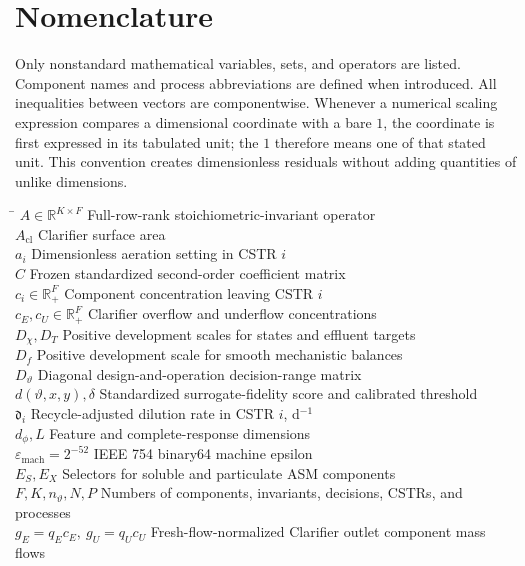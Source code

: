 \documentclass[a4paper,fleqn]{cas-sc}
\newcommand{\R}{\mathbb{R}}
\begin{document}
\section*{Nomenclature}
\noindent Only nonstandard mathematical variables, sets, and operators are listed. Component names and process abbreviations are defined when introduced. All inequalities between vectors are componentwise.
Whenever a numerical scaling expression compares a dimensional coordinate with a bare $1$, the coordinate is first expressed in its tabulated unit; the $1$ therefore means one of that stated unit. This convention creates dimensionless residuals without adding quantities of unlike dimensions.
\begin{tabbing}
\hspace{4.3cm} \= \kill
$A\in\R^{K\times F}$ \> Full-row-rank stoichiometric-invariant operator \\
$A_{\mathrm{cl}}$ \> Clarifier surface area \\
$a_i$ \> Dimensionless aeration setting in CSTR $i$ \\
$\widehat C$ \> Frozen standardized second-order coefficient matrix \\
$c_i\in\R_+^F$ \> Component concentration leaving CSTR $i$ \\
$c_E,c_U\in\R_+^F$ \> Clarifier overflow and underflow concentrations \\
$D_\chi,D_T$ \> Positive development scales for states and effluent targets \\
$D_f$ \> Positive development scale for smooth mechanistic balances \\
$D_\vartheta$ \> Diagonal design-and-operation decision-range matrix \\
$d(\vartheta,x,y),\delta$ \> Standardized surrogate-fidelity score and calibrated threshold \\
$\mathfrak d_i$ \> Recycle-adjusted dilution rate in CSTR $i$, d$^{-1}$ \\
$d_\phi,L$ \> Feature and complete-response dimensions \\
$\varepsilon_{\mathrm{mach}}=2^{-52}$ \> IEEE 754 binary64 machine epsilon \\
$E_S,E_X$ \> Selectors for soluble and particulate ASM components \\
$F,K,n_\vartheta,N,P$ \> Numbers of components, invariants, decisions, CSTRs, and processes \\
$g_E=q_Ec_E,\ g_U=q_Uc_U$ \> Fresh-flow-normalized Clarifier outlet component mass flows \\

\end{tabbing}
\end{document}

